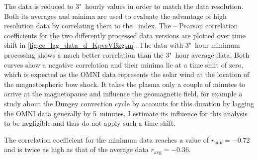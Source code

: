 The data is reduced to 3"~hourly values in order to match the \Kp{} data resolution. Both its averages and minima are used to evaluate the advantage of high resolution data by correlating them to the \Kp~index. The \Kp{}--\vBz{} Pearson correlation coefficients for the two differently processed data versions are plotted over time shift in \autoref{fig:cc_lag_data_d_KpvsVBzgsm}. The data with 3"~hour minimum processing shows a much better correlation than the 3"~hour average data. Both curves show a negative correlation and their minima lie at a time shift of zero, which is expected as the OMNI data represents the solar wind at the location of the magnetospheric bow shock. It takes the plasma only a couple of minutes to arrive at the magnetopause and influence the geomagnetic field, for example a study about the Dungey convection cycle by \citet{Zhang2015} accounts for this duration by lagging the OMNI data generally by 5~minutes. I estimate its influence for this analysis to be negligible and thus do not apply such a time shift.

The correlation coefficient for the minimum data reaches a value of $r_\text{min} = -0.72$ and is twice as high as that of the average data $r_\text{avg} = -0.36$.



